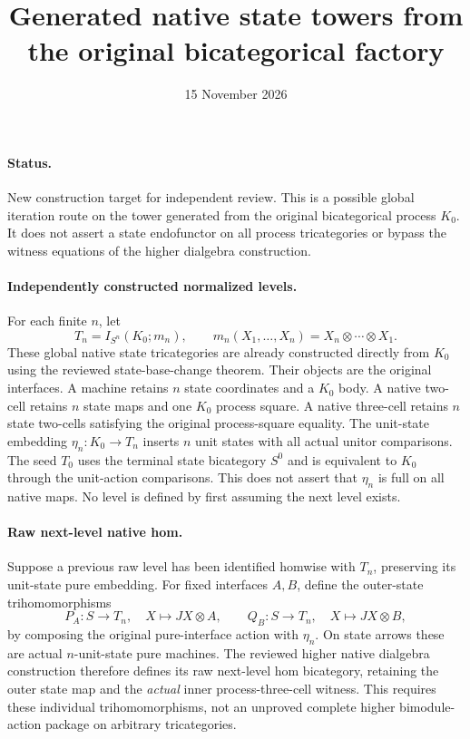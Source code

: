 \documentclass{article}
\title{Generated native state towers from the original bicategorical factory}
\date{15 November 2026}
\begin{document}
\maketitle
\paragraph{Status.} New construction target for independent review. This is a possible global iteration route on the tower generated from the original bicategorical process $K_0$. It does not assert a state endofunctor on all process tricategories or bypass the witness equations of the higher dialgebra construction.

\paragraph{Independently constructed normalized levels.} For each finite $n$, let
\[
 T_n=I_{S^n}(K_0;m_n),\qquad
 m_n(X_1,\ldots,X_n)=X_n\otimes\cdots\otimes X_1.
\]
These global native state tricategories are already constructed directly from $K_0$ using the reviewed state-base-change theorem. Their objects are the original interfaces. A machine retains $n$ state coordinates and a $K_0$ body. A native two-cell retains $n$ state maps and one $K_0$ process square. A native three-cell retains $n$ state two-cells satisfying the original process-square equality. The unit-state embedding $\eta_n:K_0\to T_n$ inserts $n$ unit states with all actual unitor comparisons. The seed $T_0$ uses the terminal state bicategory $S^0$ and is equivalent to $K_0$ through the unit-action comparisons. This does not assert that $\eta_n$ is full on all native maps. No level is defined by first assuming the next level exists.

\paragraph{Raw next-level native hom.} Suppose a previous raw level has been identified homwise with $T_n$, preserving its unit-state pure embedding. For fixed interfaces $A,B$, define the outer-state trihomomorphisms
\[
 P_A:S\longrightarrow T_n,\quad X\longmapsto JX\otimes A,
 \qquad Q_B:S\longrightarrow T_n,\quad X\longmapsto JX\otimes B,
\]
by composing the original pure-interface action with $\eta_n$. On state arrows these are actual $n$-unit-state pure machines. The reviewed higher native dialgebra construction therefore defines its raw next-level hom bicategory, retaining the outer state map and the \emph{actual} inner process-three-cell witness. This requires these individual trihomomorphisms, not an unproved complete higher bimodule-action package on arbitrary tricategories.
\end{document}
